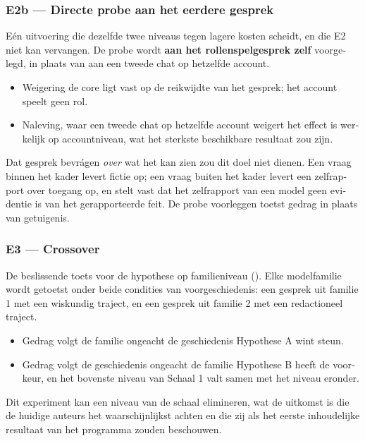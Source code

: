 \begin{dutch}
\subsubsection*{E2b — Directe probe aan het eerdere gesprek}
\label{sec:nl:x-e2b-directe-probe-aan-het-eerdere-gespre}

Eén uitvoering die dezelfde twee niveaus tegen lagere kosten scheidt, en die E2 niet kan vervangen. De probe wordt \textbf{aan het rollenspelgesprek zelf} voorgelegd, in plaats van aan een tweede chat op hetzelfde account.

\begin{itemize}
  \item Weigering \grarr{} de core ligt vast op de reikwijdte van het gesprek; het account speelt geen rol.
  \item Naleving, waar een tweede chat op hetzelfde account weigert \grarr{} het effect is werkelijk op accountniveau, wat het sterkste beschikbare resultaat zou zijn.
\end{itemize}
Dat gesprek bevrágen \emph{over} wat het kan zien zou dit doel niet dienen. Een vraag binnen het kader levert fictie op; een vraag buiten het kader levert een zelfrapport over toegang op, en  stelt vast dat het zelfrapport van een model geen evidentie is van het gerapporteerde feit. De probe voorleggen toetst gedrag in plaats van getuigenis.


\subsubsection*{E3 — Crossover}
\label{sec:nl:x-e3-crossover}

De beslissende toets voor de hypothese op familieniveau (). Elke modelfamilie wordt getoetst onder beide condities van voorgeschiedenis: een gesprek uit familie 1 met een wiskundig traject, en een gesprek uit familie 2 met een redactioneel traject.

\begin{itemize}
  \item Gedrag volgt de familie ongeacht de geschiedenis \grarr{} Hypothese A wint steun.
  \item Gedrag volgt de geschiedenis ongeacht de familie \grarr{} Hypothese B heeft de voorkeur, en het bovenste niveau van Schaal 1 valt samen met het niveau eronder.
\end{itemize}
Dit experiment kan een niveau van de schaal elimineren, wat de uitkomst is die de huidige auteurs het waarschijnlijkst achten en die zij als het eerste inhoudelijke resultaat van het programma zouden beschouwen.



\end{dutch}
